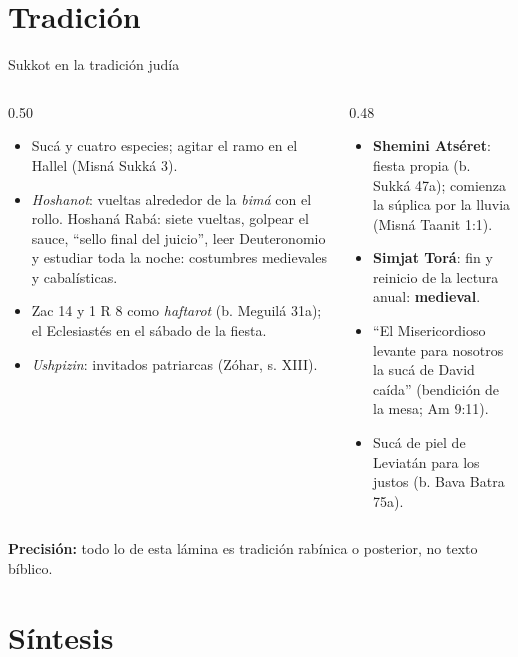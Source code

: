 \documentclass[hyperref={bookmarks=false},aspectratio=169]{beamer}
\newcommand{\destacar}[1]{\textbf{\textcolor{tierraroja}{#1}}}
\newcommand{\precision}[1]{{\footnotesize\color{sepia}\textbf{Precisión:} #1}}
\begin{document}
\section{Tradición}

\begin{frame}{Sukkot en la tradición judía}
\begin{columns}[t,onlytextwidth]
\begin{column}{0.50\textwidth}\scriptsize
\begin{itemize}
\item Sucá y cuatro especies; agitar el ramo en el Hallel (Misná Sukká 3).
\item \emph{Hoshanot}: vueltas alrededor de la \emph{bimá} con el rollo. Hoshaná Rabá: siete vueltas, golpear el sauce, ``sello final del juicio'', leer Deuteronomio y estudiar toda la noche: costumbres medievales y cabalísticas.
\item Zac 14 y 1 R 8 como \emph{haftarot} (b. Meguilá 31a); el Eclesiastés en el sábado de la fiesta.
\item \emph{Ushpizin}: invitados patriarcas (Zóhar, s. XIII).
\end{itemize}
\end{column}
\begin{column}{0.48\textwidth}\scriptsize
\begin{itemize}
\item \textbf{Shemini Atséret}: fiesta propia (b. Sukká 47a); comienza la súplica por la lluvia (Misná Taanit 1:1).
\item \textbf{Simjat Torá}: fin y reinicio de la lectura anual: \destacar{medieval}.
\item ``El Misericordioso levante para nosotros la sucá de David caída'' (bendición de la mesa; Am 9:11).
\item Sucá de piel de Leviatán para los justos (b. Bava Batra 75a).
\end{itemize}
\end{column}
\end{columns}\par\medskip
\precision{todo lo de esta lámina es tradición rabínica o posterior, no texto bíblico.}
\end{frame}

\section{Síntesis}
\end{document}
